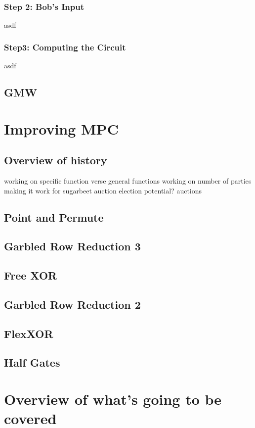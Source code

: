 \documentclass[12pt,twoside]{reedthesis}
\begin{document}
\subsubsection{Step 2: Bob's Input}
asdf

\subsubsection{Step3: Computing the Circuit}
asdf

\subsection{GMW}

\section{Improving MPC}
\subsection{Overview of history}
working on specific function verse general functions
working on number of parties
making it work for sugarbeet auction
election potential?
auctions


\subsection{Point and Permute}
\subsection{Garbled Row Reduction 3}
\subsection{Free XOR}
\subsection{Garbled Row Reduction 2}
\subsection{FlexXOR}
\subsection{Half Gates}

\section{Overview of what's going to be covered}
\end{document}
